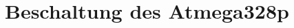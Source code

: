 \documentclass[12pt,journal]{IEEEtran}
\begin{document}
%
%

%
%



\section{Beschaltung des Atmega328p}
\end{document}
